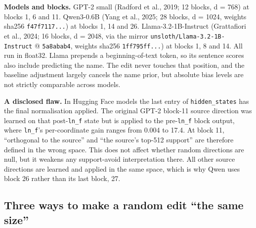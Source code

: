 \documentclass[
  10pt,
]{article}
\begin{document}
\textbf{Models and blocks.} GPT-2 small (Radford et al., 2019; 12
blocks, d = 768) at blocks 1, 6 and 11. Qwen3-0.6B (Yang et al., 2025;
28 blocks, d = 1024, weights sha256 \texttt{f47f7117...}) at blocks 1, 14
and 26. Llama-3.2-1B-Instruct (Grattafiori et al., 2024; 16 blocks, d =
2048, via the mirror \texttt{unsloth/Llama-3.2-1B-Instruct} @
\texttt{5a8abab4}, weights sha256 \texttt{1ff795ff...}) at blocks 1, 8 and
14. All run in float32. Llama prepends a beginning-of-text token, so its
sentence scores also include predicting the name. The edit never touches
that position, and the baseline adjustment largely cancels the name
prior, but absolute bias levels are not strictly comparable across
models.

\textbf{A disclosed flaw.} In Hugging Face models the last entry of
\texttt{hidden\_states} has the final normalisation applied. The
original GPT-2 block-11 source direction was learned on that
post-\texttt{ln\_f} state but is applied to the pre-\texttt{ln\_f} block
output, where \texttt{ln\_f}'s per-coordinate gain ranges from 0.004 to
17.4. At block 11, ``orthogonal to the source'' and ``the source's
top-512 support'' are therefore defined in the wrong space. This does
not affect whether random directions are null, but it weakens any
support-avoid interpretation there. All other source directions are
learned and applied in the same space, which is why Qwen uses block 26
rather than its last block, 27.

\subsection{Three ways to make a random edit ``the same
size''}\label{three-ways-to-make-a-random-edit-the-same-size}
\end{document}

